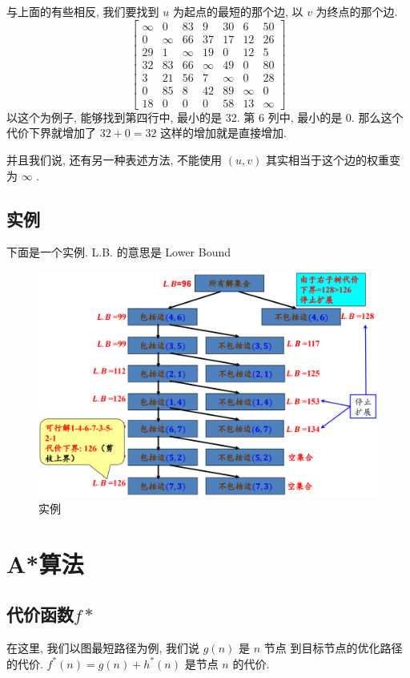\documentclass[a4paper, 10pt]{ctexart} %
\begin{document}
与上面的有些相反, 我们要找到 $u$ 为起点的最短的那个边, 以 $v$ 为终点的那个边. 
\[
\begin{bmatrix}
    \infty & 0 & 83 & 9 & 30 & 6 & 50 \\
    0 & \infty & 66 & 37 & 17 & 12 & 26 \\
    29 & 1 & \infty & 19 & 0 & 12 & 5\\
    32 & 83 & 66 & \infty & 49 & 0 & 80 \\
    3 & 21 & 56 &  7 & \infty &  0& 28\\
    0 & 85 & 8 & 42 & 89 & \infty & 0\\
    18 & 0 & 0 & 0 & 58 & 13 & \infty 
\end{bmatrix}
\]
以这个为例子, 能够找到第四行中, 最小的是 32. 第 6 列中, 最小的是 0.
那么这个代价下界就增加了 $32 + 0 = 32$ 
这样的增加就是直接增加.

并且我们说, 还有另一种表述方法, 不能使用 $\left(  u ,v\right)$ 其实相当于这个边的权重变为 $ \infty  $ .
\subsection{实例} %
\label{sub:实例}
下面是一个实例. L.B. 的意思是 Lower Bound
\begin{figure}
    \centering
    \includegraphics[scale = 0.5]{ss10.png}
    \caption{实例}
    \label{fig:tu11}
\end{figure}

\section{A*算法}
\subsection{代价函数$f*$} %
\label{sub:代价函数}
在这里, 我们以图最短路径为例, 
我们说 $g\left(n\right)$ 是 $n$ 节点
到目标节点的优化路径的代价. 
$f^{*}\left( n\right) = g\left(n\right) + h ^{*} \left(n\right)$ 是节点 $n$ 的代价.
\end{document}
